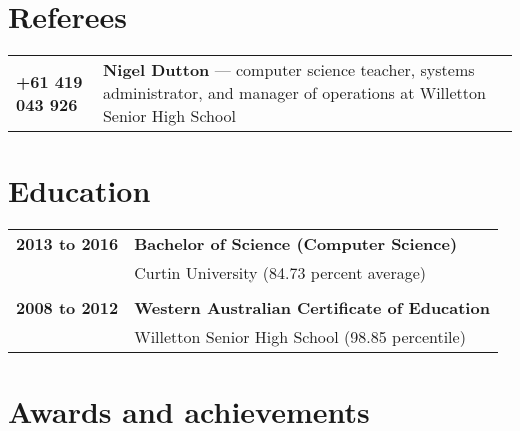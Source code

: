\documentclass[a4paper,12pt]{article}
\begin{document}
\section*{Referees}

\begin{tabular}{p{35mm}p{125mm}}
	                    \textbf{+61 419 043 926}    & \textbf{Nigel Dutton} --- computer science teacher, systems administrator, and manager of operations at Willetton Senior High School
\end{tabular}

\section*{Education}

\begin{tabular}{p{35mm}p{125mm}}
	                    \textbf{2013 to 2016}       & \textbf{Bachelor of Science (Computer Science)}
	\vspace{0.2em}  \\                              & Curtin University (84.73 percent average)
	\\              \\  \textbf{2008 to 2012}       & \textbf{Western Australian Certificate of Education}
	\vspace{0.2em}  \\                              & Willetton Senior High School (98.85 percentile)
\end{tabular}

\section*{Awards and achievements}
\end{document}
